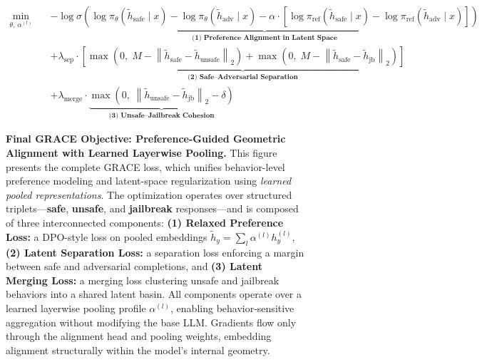 \begin{figure}[ht!]
\vspace{-5mm}
\centering
\begin{tcolorbox}[
  enhanced,
  colback=white,
  colframe=black,
  boxrule=0.8pt,
  borderline={0.6pt}{1.6pt}{black},
  sharp corners,
  width=0.99\textwidth,
  left=2pt,
  right=2pt,
  top=2pt,
  bottom=1pt
]
\tiny
\[
\begin{aligned}
\min_{\theta,\, \alpha^{(l)}} \quad &
\underbrace{
-\log \sigma\left(
\log \pi_\theta(\tilde{h}_{\mathrm{safe}} \mid x)
- \log \pi_\theta(\tilde{h}_{\mathrm{adv}} \mid x)
- \alpha \cdot \left[
\log \pi_{\mathrm{ref}}(\tilde{h}_{\mathrm{safe}} \mid x)
- \log \pi_{\mathrm{ref}}(\tilde{h}_{\mathrm{adv}} \mid x)
\right]
\right)
}_{\textbf{(1) Preference Alignment in Latent Space}} \\[-1pt]
&+ \lambda_{\mathrm{sep}} \cdot
\underbrace{
\left[
\max\left(0,\; M - \left\| \tilde{h}_{\mathrm{safe}} - \tilde{h}_{\mathrm{unsafe}} \right\|_2 \right)
+
\max\left(0,\; M - \left\| \tilde{h}_{\mathrm{safe}} - \tilde{h}_{\mathrm{jb}} \right\|_2 \right)
\right]
}_{\textbf{(2) Safe–Adversarial Separation}} \\[-1pt]
&+ \lambda_{\mathrm{merge}} \cdot
\underbrace{
\max\left(0,\; \left\| \tilde{h}_{\mathrm{unsafe}} - \tilde{h}_{\mathrm{jb}} \right\|_2 - \delta \right)
}_{\textbf{(3) Unsafe–Jailbreak Cohesion}}
\end{aligned}
\]
\end{tcolorbox}
\vspace{-3mm}
\caption{
\textbf{Final GRACE Objective: Preference-Guided Geometric Alignment with Learned Layerwise Pooling.}
This figure presents the complete GRACE loss, which unifies behavior-level preference modeling and latent-space regularization using \emph{learned pooled representations}. The optimization operates over structured triplets—\textbf{safe}, \textbf{unsafe}, and \textbf{jailbreak} responses—and is composed of three interconnected components:
\textbf{(1) Relaxed Preference Loss:}  a DPO-style loss on pooled embeddings \(\tilde{h}_y = \sum_l \alpha^{(l)} h_y^{(l)}\),
\textbf{(2) Latent Separation Loss:} a separation loss enforcing a margin between safe and adversarial completions, and
\textbf{(3) Latent Merging Loss:} a merging loss clustering unsafe and jailbreak behaviors into a shared latent basin.
All components operate over a learned layerwise pooling profile \(\alpha^{(l)}\), enabling behavior-sensitive aggregation without modifying the base LLM. Gradients flow only through the alignment head and pooling weights, embedding alignment structurally within the model's internal geometry.
}
\label{fig:final_objective_geometric_dpo}
\vspace{-4mm}
\end{figure}


